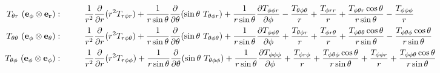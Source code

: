 \documentclass[11pt]{article}
\newcommand{\dr}{\frac{\partial}{\partial r}}
\begin{document}
\begin{landscape}
\begin{align}
T_{\theta r} \ ({\bf{e_\phi \otimes e_r}}): & \hspace{1cm} \frac{1}{r^2}\dr (r^2 T_{r \phi r}) + \frac{1}{r\sin{\theta}}\frac{\partial}{\partial \theta} (\sin{\theta} \ T_{\theta \phi r}) + \frac{1}{r\sin{\theta}}\frac{\partial T_{\phi \phi r}}{\partial \phi} - \frac{T_{\theta \phi \theta}}{r} + \frac{T_{\phi rr}}{r} + \frac{T_{\phi \theta r} \cos{\theta}}{r\sin{\theta}} -\frac{T_{\phi \phi \phi}}{r} \\
T_{\theta \theta} \ ({\bf{e_\phi \otimes e_\theta}}): & \hspace{1cm} \frac{1}{r^2}\dr (r^2 T_{r \phi \theta}) + \frac{1}{r\sin{\theta}}\frac{\partial}{\partial \theta} (\sin{\theta} \ T_{\theta \phi \theta}) + \frac{1}{r\sin{\theta}}\frac{\partial T_{\phi \phi \theta}}{\partial \phi} + \frac{T_{\theta \phi r}}{r} + \frac{T_{\phi r \theta}}{r} + \frac{T_{\phi \theta \theta} \cos{\theta}}{r\sin{\theta}} - \frac{T_{\phi \theta \phi} \cos{\theta}}{r\sin{\theta}}  \\
T_{\theta \phi} \ ({\bf{e_\phi \otimes e_\phi}}): & \hspace{1cm} \frac{1}{r^2}\dr (r^2 T_{r \phi \phi}) + \frac{1}{r\sin{\theta}}\frac{\partial}{\partial \theta} (\sin{\theta} \ T_{\theta \phi \phi}) + \frac{1}{r\sin{\theta}}\frac{\partial T_{\phi \phi \phi}}{\partial \phi} + \frac{T_{\phi r \phi}}{r} + \frac{T_{\phi \theta \phi} \cos{\theta}}{r\sin{\theta}} + \frac{T_{\phi \phi r}}{r} + \frac{T_{\phi \phi \theta} \cos{\theta}}{r\sin{\theta}}
\end{align}

\end{landscape}
\end{document}
